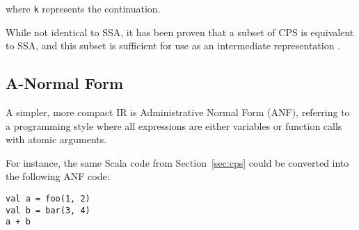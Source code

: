 where \texttt{k} represents the continuation.

While not identical to SSA, it has been proven that a subset of CPS is equivalent to SSA, and this
subset is sufficient for use as an intermediate representation \autocite{kelsey1993correspondence}.

\subsection{A-Normal Form}

A simpler, more compact IR is Administrative Normal Form (ANF), referring to a programming style
where all expressions are either variables or function calls with atomic arguments.

For instance, the same Scala code from Section~\ref{sec:cps} could be converted into the following
ANF code:

\begin{verbatim}
val a = foo(1, 2)
val b = bar(3, 4)
a + b
\end{verbatim}
